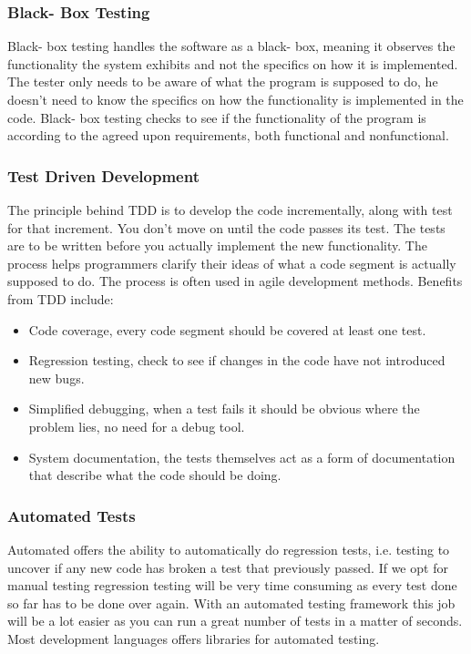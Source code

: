 \subsubsection{Black- Box Testing}
Black- box testing handles the software as a black- box, meaning it observes the functionality the system exhibits and not the specifics on how it is implemented. The tester only needs to be aware of what the program is supposed to do, he doesn't need to know the specifics on how the functionality is implemented in the code. Black- box testing checks to see if the functionality of the program is according to the agreed upon requirements, both functional and nonfunctional. 

\subsubsection{Test Driven Development}
The principle behind TDD is to develop the code incrementally, along with test for that increment. You don’t move on until the code passes its test. The tests are to be written before you actually implement the new functionality. The process helps programmers clarify their ideas of what a code segment is actually supposed to do. The process is often used in agile development methods.
Benefits from TDD include: 
\begin{itemize}

\item Code coverage, every code segment should be covered at least one test.

\item Regression testing, check to see if changes in the code have not introduced new bugs.

\item Simplified debugging, when a test fails it should be obvious where the problem lies, no need for a debug tool.

\item System documentation, the tests themselves act as a form of documentation that describe what the code should be doing.

\end{itemize}

\subsubsection{Automated Tests}
Automated offers the ability to automatically do regression tests, i.e. testing to uncover if any new code has broken a test that previously passed. If we opt for manual testing regression testing will be very time consuming as every test done so far has to be done over again. With an automated testing framework this job will be a lot easier as you can run a great number of tests in a matter of seconds. Most development languages offers libraries for automated testing.


